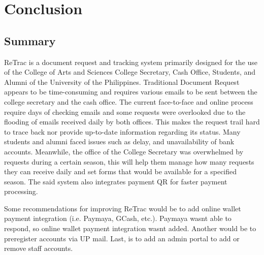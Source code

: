 \chapter{Conclusion}
\section{Summary}
ReTrac is a document request and tracking system primarily designed for the use of the College of Arts and Sciences College Secretary, Cash Office, Students, and Alumni of the University of the Philippines. Traditional Document Request appears to be time-consuming and requires various emails to be sent between the college secretary and the cash office. The current face-to-face and online process require days of checking emails and some requests were overlooked due to the flooding of emails received daily by both offices. This makes the request trail hard to trace back nor provide up-to-date information regarding its status. Many students and alumni faced issues such as delay, and unavailability of bank accounts. Meanwhile, the office of the College Secretary was overwhelmed by requests during a certain season, this will help them manage how many requests they can receive daily and set forms that would be available for a specified season. The said system also integrates payment QR for faster payment processing. 

Some recommendations for improving ReTrac would be to add online wallet payment integration (i.e. Paymaya, GCash, etc.). Paymaya wasn\textsc{}t able to respond, so online wallet payment integration wasn\textsc{}t added. Another would be to preregister accounts via UP mail. Last,  is to add an admin portal to add or remove staff accounts. 


